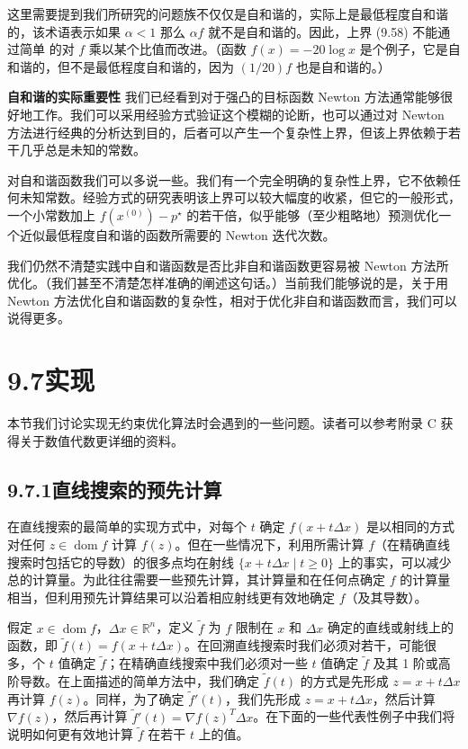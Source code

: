 \documentclass[UTF8,12pt,a4paper,fontset=fandol]{ctexart}
\begin{document}
这里需要提到我们所研究的问题族不仅仅是自和谐的，实际上是最低程度自和谐的，该术语表示如果 $\alpha<1$ 那么 $\alpha f$ 就不是自和谐的。因此，上界 (9.58) 不能通过简单
的对 $f$ 乘以某个比值而改进。（函数 $f(x)=-20\log x$ 是个例子，它是自和谐的，但不是最低程度自和谐的，因为 $(1/20)f$ 也是自和谐的。）

\noindent\textbf{自和谐的实际重要性}\quad
我们已经看到对于强凸的目标函数 Newton 方法通常能够很好地工作。我们可以采用经验方式验证这个模糊的论断，也可以通过对 Newton 方法进行经典的分析达到目的，后者可以产生一个复杂性上界，但该上界依赖于若干几乎总是未知的常数。

对自和谐函数我们可以多说一些。我们有一个完全明确的复杂性上界，它不依赖任何未知常数。经验方式的研究表明该上界可以较大幅度的收紧，但它的一般形式，一个小常数加上 $f(x^{(0)})-p^\star$ 的若干倍，似乎能够（至少粗略地）预测优化一个近似最低程度自和谐的函数所需要的 Newton 迭代次数。

我们仍然不清楚实践中自和谐函数是否比非自和谐函数更容易被 Newton 方法所优化。（我们甚至不清楚怎样准确的阐述这句话。）当前我们能够说的是，关于用 Newton 方法优化自和谐函数的复杂性，相对于优化非自和谐函数而言，我们可以说得更多。

\section*{9.7\quad 实现}

本节我们讨论实现无约束优化算法时会遇到的一些问题。读者可以参考附录 C 获得关于数值代数更详细的资料。

\subsection*{9.7.1\quad 直线搜索的预先计算}

在直线搜索的最简单的实现方式中，对每个 $t$ 确定 $f(x+t\Delta x)$ 是以相同的方式对任何 $z\in\operatorname{dom} f$ 计算 $f(z)$。但在一些情况下，利用所需计算 $f$（在精确直线搜索时包括它的导数）的很多点均在射线 $\{x+t\Delta x\mid t\geq0\}$ 上的事实，可以减少总的计算量。为此往往需要一些预先计算，其计算量和在任何点确定 $f$ 的计算量相当，但利用预先计算结果可以沿着相应射线更有效地确定 $f$（及其导数）。

假定 $x\in\operatorname{dom} f$，$\Delta x\in\mathbb{R}^n$，定义 $\tilde{f}$ 为 $f$ 限制在 $x$ 和 $\Delta x$ 确定的直线或射线上的函数，即 $\tilde{f}(t)=f(x+t\Delta x)$。在回溯直线搜索时我们必须对若干，可能很多，个 $t$ 值确定 $\tilde{f}$；在精确直线搜索中我们必须对一些 $t$ 值确定 $\tilde{f}$ 及其 1 阶或高阶导数。在上面描述的简单方法中，我们确定 $\tilde{f}(t)$ 的方式是先形成 $z=x+t\Delta x$ 再计算 $f(z)$。同样，为了确定 $\tilde{f}'(t)$，我们先形成 $z=x+t\Delta x$，然后计算 $\nabla f(z)$，然后再计算 $\tilde{f}'(t)=\nabla f(z)^T\Delta x$。在下面的一些代表性例子中我们将说明如何更有效地计算 $\tilde{f}$ 在若干 $t$ 上的值。
\end{document}
